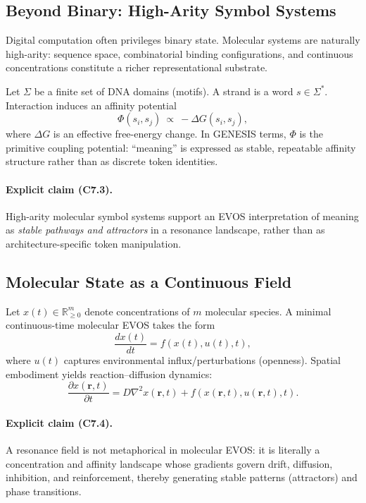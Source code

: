 \documentclass[11pt]{article}
\begin{document}
\subsection{Beyond Binary: High-Arity Symbol Systems}
\label{sec:high-arity}

Digital computation often privileges binary state. Molecular systems are naturally
high-arity: sequence space, combinatorial binding configurations, and continuous
concentrations constitute a richer representational substrate.

Let $\Sigma$ be a finite set of DNA domains (motifs). A strand is a word $s \in \Sigma^\ast$.
Interaction induces an affinity potential
\[
\Phi(s_i,s_j)\ \propto\ -\Delta G(s_i,s_j),
\]
where $\Delta G$ is an effective free-energy change. In GENESIS terms, $\Phi$ is the
primitive coupling potential: ``meaning'' is expressed as stable, repeatable affinity
structure rather than as discrete token identities.

\paragraph{Explicit claim (C7.3).}
High-arity molecular symbol systems support an EVOS interpretation of meaning as
\emph{stable pathways and attractors} in a resonance landscape, rather than as
architecture-specific token manipulation.

\subsection{Molecular State as a Continuous Field}
\label{sec:molecular-field}

Let $x(t) \in \mathbb{R}_{\ge 0}^m$ denote concentrations of $m$ molecular species.
A minimal continuous-time molecular EVOS takes the form
\[
\frac{dx(t)}{dt} = f(x(t), u(t), t),
\]
where $u(t)$ captures environmental influx/perturbations (openness). Spatial embodiment
yields reaction--diffusion dynamics:
\[
\frac{\partial x(\mathbf{r},t)}{\partial t} = D\nabla^2 x(\mathbf{r},t) + f(x(\mathbf{r},t),u(\mathbf{r},t),t).
\]

\paragraph{Explicit claim (C7.4).}
A resonance field is not metaphorical in molecular EVOS: it is literally a concentration
and affinity landscape whose gradients govern drift, diffusion, inhibition, and
reinforcement, thereby generating stable patterns (attractors) and phase transitions.
\end{document}
